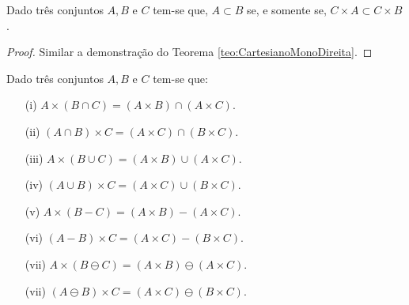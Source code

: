 \begin{theorem}
	Dado três conjuntos $A, B$ e $C$ tem-se que, $A \subset B$ se, e somente se, $C \times A \subset C \times B$.
\end{theorem}

\begin{proof}
	Similar a demonstração do Teorema \ref{teo:CartesianoMonoDireita}.
\end{proof}


\begin{theorem}\label{teo:DistributividadeCartesiano}
	Dado três conjuntos $A, B$ e $C$ tem-se que:
	\begin{itemize}
		\item[(i)] $A \times (B \cap C) = (A \times B) \cap (A \times C)$.
		\item[(ii)] $(A \cap B) \times C = (A \times C) \cap (B \times C)$.
		\item[(iii)] $A \times (B \cup C) = (A \times B) \cup (A \times C)$.
		\item[(iv)] $(A \cup B) \times C = (A \times C) \cup (B \times C)$.
		\item[(v)] $A \times (B - C) = (A \times B) - (A \times C)$.
		\item[(vi)] $(A - B) \times C = (A \times C) - (B \times C)$.
		\item[(vii)] $A \times (B \ominus C) = (A \times B) \ominus (A \times C)$.
		\item[(vii)] $(A \ominus B) \times C = (A \times C) \ominus (B \times C)$.
	\end{itemize}
\end{theorem}

\

